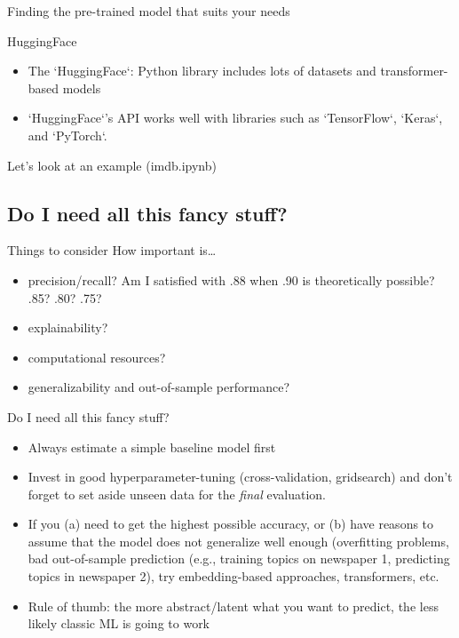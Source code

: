 \documentclass[compress]{beamer}
\begin{document}
\begin{frame}{Finding the pre-trained model that suits your needs}
	\begin{block}{HuggingFace}
		\begin{itemize}[<+->]
			\item The `HuggingFace`: Python library includes lots of datasets and transformer-based models 
			\item `HuggingFace`'s API works well with libraries such as `TensorFlow`, `Keras`, and `PyTorch`. 
		\end{itemize}
	\end{block}
\end{frame}

\begin{frame}[standout]
	Let's look at an example (imdb.ipynb)
\end{frame}

\subsection{Do I need all this fancy stuff?}

\begin{frame}{Things to consider}
	How important is\ldots
	\begin{itemize}[<+->]
		\item precision/recall? Am I satisfied with .88 when .90 is theoretically possible? .85? .80? .75?
		\item explainability?
		\item computational resources?
		\item generalizability and out-of-sample performance?
	\end{itemize}
\end{frame}

\begin{frame}{Do I need all this fancy stuff?}
	\begin{itemize}[<+->]
		\item Always estimate a simple baseline model first
		\item Invest in good hyperparameter-tuning (cross-validation, gridsearch) and don't forget to set aside unseen data for the \emph{final} evaluation.
		\item If you (a) need to get the highest possible accuracy, or (b) have reasons to assume that the model does not generalize well enough (overfitting problems, bad out-of-sample prediction (e.g., training topics on newspaper 1, predicting topics in newspaper 2), try embedding-based approaches, transformers, etc.
		\item Rule of thumb: the more abstract/latent what you want to predict, the less likely classic ML is going to work
	\end{itemize}
\end{frame}
\end{document}
